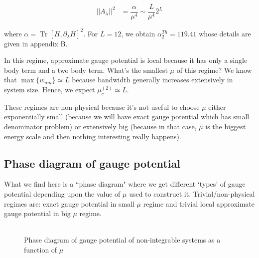 \documentclass[11pt,a4paper]{article}
\DeclareMathOperator{\Tr}{Tr}
\begin{document}
\begin{itemize}
\begin{align*}
||A_{\lambda}||^2 &=\dfrac{\alpha}{ \mu^4} \sim\dfrac{L}{ \mu^4} 2^L 
\end{align*}

where $\alpha=\Tr  [H, \partial_{\lambda}H]^2 $.  For $L=12$, we obtain $\alpha_2^{Th}=119.41$ whose details are given in appendix B.


In this regime, approximate gauge potential is local because it has only a single body term and a two body term. What's the smallest $\mu$ of this regime? We know that $\max\{w_{nm}\} \simeq L$  because bandwidth generally increases extensively in system size. Hence, we expect $\mu_c^{(2)} \simeq L$.
\end{itemize}

These regimes are non-physical because it's not useful to choose $\mu$ either exponentially small (because we will have exact gauge potential which has small denominator problem) or extensively big (because in that case, $\mu$ is the biggest energy scale and then nothing interesting really happens). 

\subsection{Phase diagram of gauge potential }

What we find here is a ``phase diagram" where we get different `types' of gauge potential depending upon the value of $\mu$ used to construct it. Trivial/non-physical regimes are: exact gauge potential in small $\mu$ regime and trivial local approximate gauge potential in big $\mu$ regime.\\
\~ \\


\begin{figure}[!ht]
\begin{center}
\end{center}
\caption{Phase diagram of gauge potential of non-integrable systems as a function of $\mu$}
\end{figure}
\end{document}
